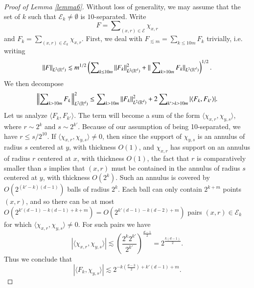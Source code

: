 \begin{proof}[Proof of Lemma \ref{lemma6}]
    Without loss of generality, we may assume that the set of $k$ such that $\mathcal{E}_k \neq \emptyset$ is $10$-separated. Write
    \begin{equation}
      F = \sum\nolimits_{(x,r) \in \mathcal{E}} \chi_{x,r}
    \end{equation}
    and $F_k = \sum\nolimits_{(x,r) \in \mathcal{E}_k} \chi_{x,r}$. First, we deal with $F_{\lesssim m} = \sum\nolimits_{k \leq 10 m} F_k$ trivially, i.e. writing
    \begin{equation}
        \| F \|_{L^2(\operatorname{\mathbb{R}}^d)} \lesssim m^{1/2} \left( \sum\nolimits_{k \leq 10m} \| F_k \|_{L^2(\operatorname{\mathbb{R}}^d)}^2 + \| \sum\nolimits_{k > 10m} F_k \|_{L^2(\operatorname{\mathbb{R}}^d)} \right)^{1/2}.
    \end{equation}
    We then decompose
    \begin{equation}
      \left\| \sum\nolimits_{k > 10 m} F_k\;\! \right\|_{L^2(\operatorname{\mathbb{R}}^d)}^2 \leq \sum\nolimits_{k > 10 m} \| F_k \|_{L^2(\operatorname{\mathbb{R}}^d)}^2 + 2 \sum\nolimits_{k' > k > 10m} |\langle F_k, F_{k'} \rangle|.
    \end{equation}
    Let us analyze $\langle F_k, F_{k'} \rangle$. The term will become a sum of the form $\langle \chi_{x,r}, \chi_{y,s} \rangle$, where $r \sim 2^k$ and $s \sim 2^{k'}$. Because of our assumption of being 10-separated, we have $r \leq s / 2^{10}$. If $\langle \chi_{x,r}, \chi_{y,s} \rangle \neq 0$, then since the support of $\chi_{y,s}$ is an annulus of radius $s$ centered at $y$, with thickness $O(1)$, and $\chi_{x,r}$ has support on an annulus of radius $r$ centered at $x$, with thickness $O(1)$, the fact that $r$ is comparatively smaller than $s$ implies that $(x,r)$ must be contained in the annulus of radius $s$ centered at $y$, with thickness $O(2^k)$. Such an annulus is covered by $O( 2^{(k'-k)(d-1)} )$ balls of radius $2^k$. Each ball can only contain $2^{k + m}$ points $(x,r)$, and so there can be at most $O( 2^{k'(d-1) - k(d-1) + k + m} ) = O( 2^{k'(d-1) - k(d-2) + m} )$ pairs $(x,r) \in \mathcal{E}_k$ for which $\langle \chi_{x,r}, \chi_{y,s} \rangle \neq 0$. For such pairs we have
    \begin{equation}
      |\langle \chi_{x,r}, \chi_{y,s} \rangle| \lesssim \left( \frac{2^k 2^{k'}}{2^{k'}} \right)^{\frac{d-1}{2}} = 2^{\frac{k(d-1)}{2}}.
    \end{equation}
    Thus we conclude that
    \begin{equation}
      |\langle F_k, \chi_{y,s} \rangle| \lesssim 2^{-k ( \frac{d-3}{2} ) + k'(d-1) + m }.

\end{equation}
\end{proof}

